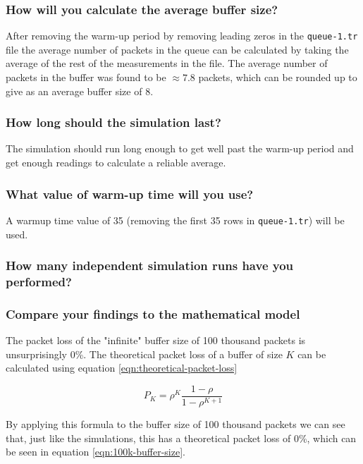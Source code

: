 \documentclass{article}
\begin{document}
    \subsubsection*{How will you calculate the average buffer size?}
    After removing the warm-up period by removing leading zeros in the \verb|queue-1.tr| file the average number of packets in the queue can be calculated by taking the average of the rest of the measurements in the file. The average number of packets in the buffer was found to be $\approx7.8$ packets, which can be rounded up to give as an average buffer size of 8.

    \subsubsection*{How long should the simulation last?}
    The simulation should run long enough to get well past the warm-up period and get enough readings to calculate a reliable average. 

    \subsubsection*{What value of warm-up time will you use?}
    A warmup time value of 35 (removing the first 35 rows in \verb|queue-1.tr|) will be used.

    \subsubsection*{How many independent simulation runs have you performed?}


    \subsubsection*{Compare your findings to the mathematical model}
    The packet loss of the "infinite" buffer size of 100 thousand packets is unsurprisingly 0\%. The theoretical packet loss of a buffer of size $K$ can be calculated using equation \ref{eqn:theoretical-packet-loss} 
    
    \begin{equation}
    \label{eqn:theoretical-packet-loss}
        P_K = \rho^K\frac{1-\rho}{1-\rho^{K+1}}
    \end{equation}
    
    By applying this formula to the buffer size of 100 thousand packets we can see that, just like the simulations, this has a theoretical packet loss of 0\%, which can be seen in equation \ref{eqn:100k-buffer-size}.
\end{document}
